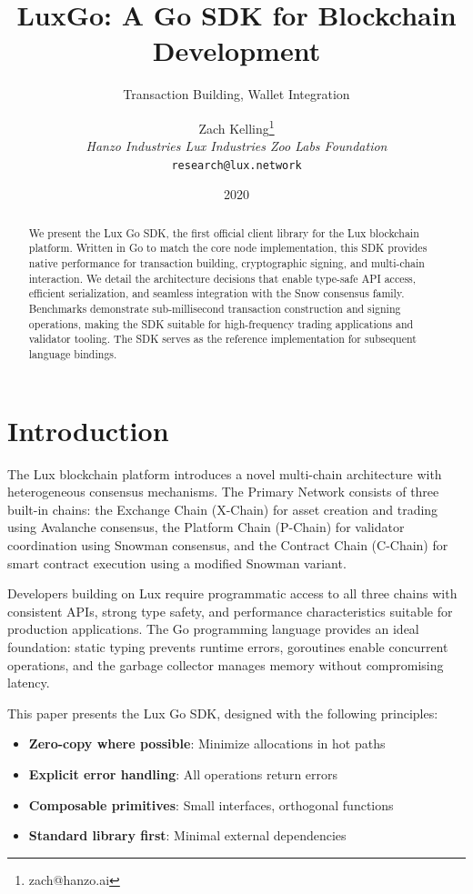\documentclass[11pt,twocolumn]{article}
\title{\textbf{LuxGo: A Go SDK for Blockchain Development}}
\subtitle{Transaction Building, Wallet Integration}
\author{Zach Kelling\thanks{zach@hanzo.ai} \\ \textit{Hanzo Industries \quad Lux Industries \quad Zoo Labs Foundation} \\ \texttt{research@lux.network}}
\date{2020}
\begin{document}
\maketitle

\begin{abstract}
We present the Lux Go SDK, the first official client library for the Lux blockchain platform. Written in Go to match the core node implementation, this SDK provides native performance for transaction building, cryptographic signing, and multi-chain interaction. We detail the architecture decisions that enable type-safe API access, efficient serialization, and seamless integration with the Snow consensus family. Benchmarks demonstrate sub-millisecond transaction construction and signing operations, making the SDK suitable for high-frequency trading applications and validator tooling. The SDK serves as the reference implementation for subsequent language bindings.
\end{abstract}

\section{Introduction}

The Lux blockchain platform introduces a novel multi-chain architecture with heterogeneous consensus mechanisms. The Primary Network consists of three built-in chains: the Exchange Chain (X-Chain) for asset creation and trading using Avalanche consensus, the Platform Chain (P-Chain) for validator coordination using Snowman consensus, and the Contract Chain (C-Chain) for smart contract execution using a modified Snowman variant.

Developers building on Lux require programmatic access to all three chains with consistent APIs, strong type safety, and performance characteristics suitable for production applications. The Go programming language provides an ideal foundation: static typing prevents runtime errors, goroutines enable concurrent operations, and the garbage collector manages memory without compromising latency.

This paper presents the Lux Go SDK, designed with the following principles:

\begin{itemize}
    \item \textbf{Zero-copy where possible}: Minimize allocations in hot paths
    \item \textbf{Explicit error handling}: All operations return errors
    \item \textbf{Composable primitives}: Small interfaces, orthogonal functions
    \item \textbf{Standard library first}: Minimal external dependencies
\end{itemize}
\end{document}

